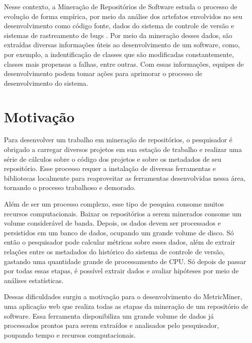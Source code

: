 \documentclass[a4paper, 12pt, twoside]{book}
\begin{document}
    Nesse contexto, a Mineração de Repositórios de Software estuda o processo de evolução de forma empírica, por meio da análise dos artefatos envolvidos no seu desenvolvimento como código fonte, dados do sistema de controle de versão e sistemas de rastreamento de bugs \cite{Kagdi:2007}. Por meio da mineração desses dados, são extraídas diversas informações úteis ao desenvolvimento de um software, como, por exemplo, a indentificação de classes que são modificadas constantemente, classes mais propensas a falhas, entre outras. Com essas informações, equipes de desenvolvimento podem tomar ações para aprimorar o processo de desenvolvimento do sistema.

    \section{Motivação}
        Para desenvolver um trabalho em mineração de repositórios, o pesquisador é obrigado 
        a carregar diversos projetos em sua estação de trabalho e realizar uma série de cálculos
        sobre o código dos projetos e sobre os metadados de seu repositório. Esse processo 
        requer a instalação de diversas ferramentas e bibliotecas localmente para reaproveitar
        as ferramentas desenvolvidas nessa área, tornando o processo trabalhoso e demorado.

        Além de ser um processo complexo, esse tipo de pesquisa consome muitos 
        recursos computacionais. Baixar os repositórios a serem minerados consome um volume
        considerável de banda. Depois, os dados devem ser processados e persistidos em um 
        banco de dados, ocupando um grande volume de disco. Só então o pesquisador pode 
        calcular métricas sobre esses dados, além de extrair relações entre os metadados do 
        histórico do sistema de controle de versão, gastando uma quantidade grande de
        processamento de CPU. Só depois de passar por todas essas etapas, é possível extrair
        dados e avaliar hipóteses por meio de análises estatísticas.

        Dessas dificuldades surgiu a motivação para o desenvolvimento do MetricMiner,
        uma aplicação web que realiza todas as etapas da mineração de um repositório de 
        software. Essa ferramenta disponibiliza um grande volume de dados já processados 
        prontos para serem extraídos e analisados pelo pesquisador, poupando tempo e recursos 
        computacionais.
    
\end{document}
